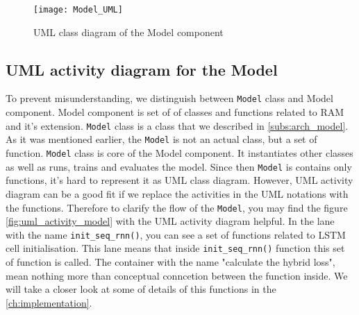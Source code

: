 \begin{figure}[H]
	\texttt{[image: Model\_UML]}
	\caption{UML class diagram of the Model component}
	\label{fig:model_uml}
\end{figure}


\subsection{UML activity diagram for the Model}
\label{subs:model_seq_diagramm}
To prevent misunderstanding, we distinguish between \lstinline{Model} class
and Model component. Model component is set of of classes and functions related
to RAM and it's extension. \lstinline{Model} class is a class that we described
in \autoref{subs:arch_model}.
As it was mentioned earlier, the \lstinline{Model} is not an actual class, but a set of
function. \lstinline{Model} class is core of the Model component. It instantiates
other classes as well as runs, trains
and evaluates the model. Since then \lstinline{Model} is contains only functions,
it's hard to represent it as UML class diagram. However, UML activity diagram
can be a good fit if we replace the activities in the UML notations with
the functions. Therefore to clarify the flow of the \lstinline{Model}, you may
find the figure \ref{fig:uml_activity_model} with the UML activity diagram helpful.
In the lane with the name \lstinline{init_seq_rnn()}, you can see a set of functions
related to LSTM cell initialisation. This lane means that inside \lstinline{init_seq_rnn()}
function this set of function is called.
The container with the name "calculate the hybrid loss", mean nothing more than
conceptual conncetion between the function inside.
We will take a closer look at some of details of this functions in the
\autoref{ch:implementation}.


%


